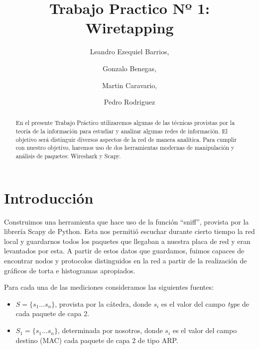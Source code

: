 \documentclass[final,narroweqnarray,inline]{ieee}
\begin{document}
\title[Trabajo Practico Nº 1: Wiretapping]{%
       Trabajo Practico Nº 1: Wiretapping}

\author[SHORT NAMES]{%
	Leandro Ezequiel Barrios,
	\and
	Gonzalo Benegas,
	\and
	Martin Caravario, 
	\and
	Pedro Rodriguez 
}

\maketitle               

\begin{abstract}
En el presente Trabajo Práctico utilizaremos algunas de las técnicas
provistas por la teoría de la información para estudiar y analizar algunas
redes de información. El objetivo será distinguir diversos aspectos de la
red de manera analítica. Para cumplir con nuestro objetivo, haremos uso de
dos herramientas modernas de manipulación y análisis de paquetes: Wireshark
y Scapy.
\end{abstract}



%
\section{ Introducción }

Construimos una herramienta que hace uso de la
función ``sniff'', provista por la librería Scapy de Python. Esta nos permitió escuchar durante
cierto tiempo la red local y guardarnos todos los paquetes que llegaban a
nuestra placa de red y eran levantados por esta. A partir de estos datos
que guardamos, fuimos capaces de encontrar  nodos y protocolos
distinguidos en la red a partir de la realización de gráficos de torta e histogramas apropiados.

Para cada una de las mediciones consideramos las siguientes fuentes: 
\begin{itemize}

  \item $S = \{s_{1} \dots s_{n}\}$, provista por la cátedra, donde $s_{i}$ es
  el valor del campo \emph{type} de cada paquete de capa 2.

  \item $S_{1} = \{s_{1} \dots s_{n}\} $, determinada por nosotros, donde
  $s_i$ es el valor del campo destino (MAC) cada paquete de capa 2 de tipo
  ARP.

\end{itemize}
\end{document}
